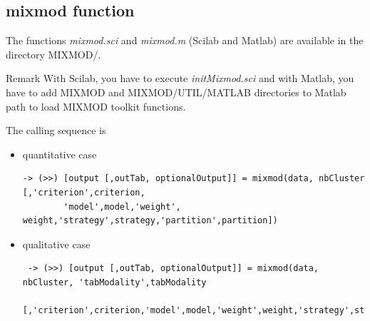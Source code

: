 \subsection{{\sc mixmod} function}
The functions {\em mixmod.sci} and {\em mixmod.m} (Scilab and Matlab) are
available in the directory MIXMOD/.


{\noindent Remark With Scilab, you have to execute {\em initMixmod.sci} and with Matlab,
you have to add {\sc MIXMOD} and {\sc MIXMOD/UTIL/MATLAB} directories to Matlab path to load
{\sc MIXMOD} toolkit functions.}



The calling sequence is
\begin{itemize}
 \item quantitative case
{\scriptsize
\begin{verbatim}
-> (>>) [output [,outTab, optionalOutput]] = mixmod(data, nbCluster [,'criterion',criterion,
        'model',model,'weight', weight,'strategy',strategy,'partition',partition])

\end{verbatim}
}

%
%





\item qualitative case
{\scriptsize
 \begin{verbatim}
 -> (>>) [output [,outTab, optionalOutput]] = mixmod(data, nbCluster, 'tabModality',tabModality
         [,'criterion',criterion,'model',model,'weight',weight,'strategy',strategy,'partition',partition])

 \end{verbatim}
 }
\end{itemize}


